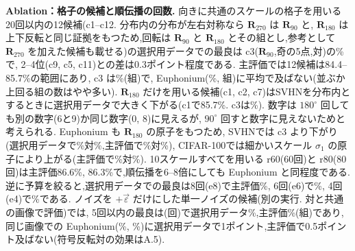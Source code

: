 \documentclass[MIRU,submit,onecolumn]{miru2025j}
\newcommand{\veps}{\vec{\varepsilon}}
\newcommand{\Rot}[1]{\mathbf{R}_{#1}}
\begin{document}
\textbf{Ablation：格子の候補と順伝播の回数.}
向きに共通のスケールの格子を用いる20回以内の12候補(c1--c12. 分布内の分布が左右対称なら $\Rot{270}$ は $\Rot{90}$ と, $\Rot{180}$ は上下反転と同じ証拠をもつため,回転は $\Rot{90}$ と $\Rot{180}$ とその組とし,参考として $\Rot{270}$ を加えた候補も載せる)の選択用データでの最良は c3($\Rot{90}$,奇の5点,対)の\selMeanPrev\%で, 2--4位(c9, c5, c11)との差は0.3ポイント程度である. 主評価では12候補は84.4--85.7\%の範囲にあり, c3 は\prevMainMean\%(\prevWins{}組)で, Euphonium(\meanSixG\%, \winsAll{}組)に平均で及ばない(並ぶか上回る組の数はやや多い). %
$\Rot{180}$ だけを用いる候補(c1, c2, c7)はSVHNを分布内とするときに選択用データで大きく下がる(c1で85.7\%. c3は\selPrevSVHN\%).%
数字は $180^\circ$ 回しても別の数字(6と9)か同じ数字(0, 8)に見えるが, $90^\circ$ 回すと数字に見えないためと考えられる. Euphonium も $\Rot{180}$ の原子をもつため, SVHNでは c3 より下がり(選択用データで\selNewSVHN\%対\selPrevSVHN\%,主評価で\oGSVHN\%対\prevSVHNmean\%), CIFAR-100では細かいスケール $\sigma_1$ の原子により上がる(主評価で\oGCh\%対\prevGCh\%).%
10スケールすべてを用いる r60(60回)と r80(80回)は主評価86.6\%, 86.3\%で,順伝播を6--8倍にしても Euphonium と同程度である. %
逆に予算を絞ると,選択用データでの最良は8回(e8)で主評価\budgetMainEight\%, 6回(e6)で\budgetMainSix\%, 4回(e4)で\budgetMainFour\%である. ノイズを $+\veps$ だけにした単一ノイズの候補(別の実行. 対と共通の画像で評価)では, 5回以内の最良は\singleFiveCand(\singleFiveNfe{}回)で選択用データ\singleFiveSel\%,主評価\singleFiveMain\%(\singleFiveWins{}組)であり,同じ画像での Euphonium(\pairOnCommonSel\%, \pairOnCommonMain\%)に選択用データで1ポイント,主評価で0.5ポイント及ばない(符号反転対の効果はA.5).
\end{document}
